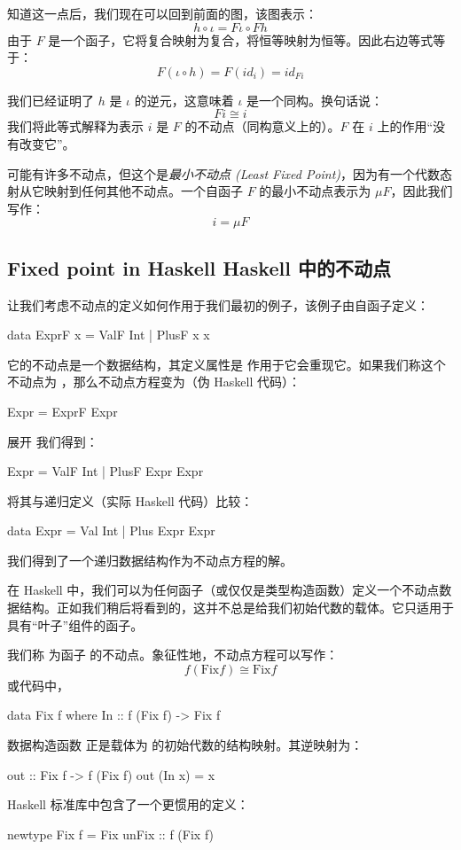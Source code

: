\documentclass[DaoFP]{subfiles}
\begin{document}
 知道这一点后，我们现在可以回到前面的图，该图表示：
 \[ h \circ \iota = F \iota \circ F h \]
 由于 $F$ 是一个函子，它将复合映射为复合，将恒等映射为恒等。因此右边等式等于：
 \[ F (\iota \circ h) = F (id_i) = id_{F i} \]

 我们已经证明了 $h$ 是 $\iota$ 的逆元，这意味着 $\iota$ 是一个同构。换句话说：
 \[ F i \cong i \]
 我们将此等式解释为表示 $i$ 是 $F$ 的不动点（同构意义上的）。$F$ 在 $i$ 上的作用“没有改变它”。

 可能有许多不动点，但这个是\emph{最小不动点 (Least Fixed Point)}，因为有一个代数态射从它映射到任何其他不动点。一个自函子 $F$ 的最小不动点表示为 $\mu F$，因此我们写作：
 \[ i = \mu F \]
 \subsection{Fixed point in Haskell Haskell 中的不动点}
 让我们考虑不动点的定义如何作用于我们最初的例子，该例子由自函子定义：
 \begin{haskell}
  data ExprF x = ValF Int | PlusF x x
 \end{haskell}
 它的不动点是一个数据结构，其定义属性是  作用于它会重现它。如果我们称这个不动点为 ，那么不动点方程变为（伪 Haskell 代码）：
 \begin{haskell}
  Expr = ExprF Expr
 \end{haskell}
 展开  我们得到：
 \begin{haskell}
  Expr = ValF Int | PlusF Expr Expr
 \end{haskell}
 将其与递归定义（实际 Haskell 代码）比较：
 \begin{haskell}
  data Expr = Val Int | Plus Expr Expr
 \end{haskell}
 我们得到了一个递归数据结构作为不动点方程的解。

 在 Haskell 中，我们可以为任何函子（或仅仅是类型构造函数）定义一个不动点数据结构。正如我们稍后将看到的，这并不总是给我们初始代数的载体。它只适用于具有“叶子”组件的函子。

 我们称  为函子  的不动点。象征性地，不动点方程可以写作：
 \[f ( \text{Fix} f) \cong  \text{Fix} f \]
 或代码中，
 \begin{haskell}
  data Fix f where
  In :: f (Fix f) -> Fix f
 \end{haskell}
 数据构造函数  正是载体为  的初始代数的结构映射。其逆映射为：
 \begin{haskell}
  out :: Fix f -> f (Fix f)
  out (In x) = x
 \end{haskell}
 Haskell 标准库中包含了一个更惯用的定义：
 \begin{haskell}
  newtype Fix f = Fix { unFix :: f (Fix f) }
 \end{haskell}
\end{document}
